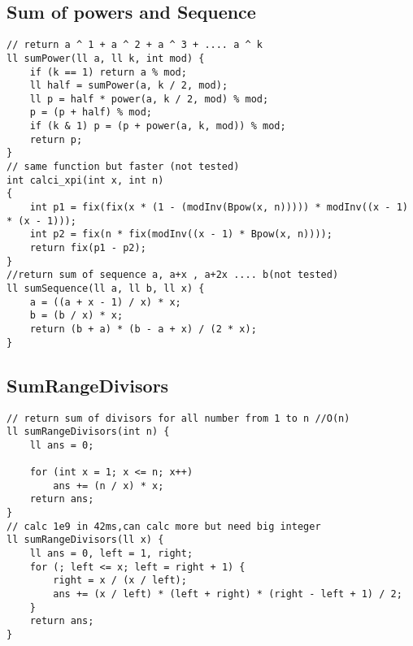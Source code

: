 \documentclass{article}
\begin{document}
\subsection{Sum of powers and Sequence}
\begin{verbatim}
// return a ^ 1 + a ^ 2 + a ^ 3 + .... a ^ k  
ll sumPower(ll a, ll k, int mod) {  
    if (k == 1) return a % mod;  
    ll half = sumPower(a, k / 2, mod);  
    ll p = half * power(a, k / 2, mod) % mod;  
    p = (p + half) % mod;  
    if (k & 1) p = (p + power(a, k, mod)) % mod;  
    return p;  
}
// same function but faster (not tested) 
int calci_xpi(int x, int n)  
{  
    int p1 = fix(fix(x * (1 - (modInv(Bpow(x, n))))) * modInv((x - 1) * (x - 1)));  
    int p2 = fix(n * fix(modInv((x - 1) * Bpow(x, n))));  
    return fix(p1 - p2);  
}
//return sum of sequence a, a+x , a+2x .... b(not tested)  
ll sumSequence(ll a, ll b, ll x) {  
    a = ((a + x - 1) / x) * x;  
    b = (b / x) * x;  
    return (b + a) * (b - a + x) / (2 * x);  
}
\end{verbatim}

\subsection{SumRangeDivisors}
\begin{verbatim}
// return sum of divisors for all number from 1 to n //O(n)  
ll sumRangeDivisors(int n) {  
    ll ans = 0;  
      
    for (int x = 1; x <= n; x++)  
        ans += (n / x) * x;  
    return ans;  
}  
// calc 1e9 in 42ms,can calc more but need big integer  
ll sumRangeDivisors(ll x) {  
    ll ans = 0, left = 1, right;  
    for (; left <= x; left = right + 1) {  
        right = x / (x / left);  
        ans += (x / left) * (left + right) * (right - left + 1) / 2;  
    }  
    return ans;  
}
\end{verbatim}
\end{document}
